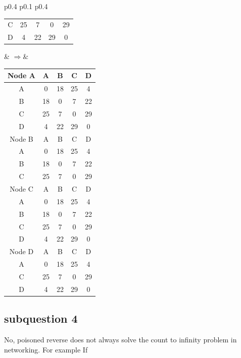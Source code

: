 \documentclass{article}
\begin{document}
\begin{tabular}{p{0.4\linewidth} p{0.1\linewidth} p{0.4\linewidth}}
\begin{tabular}{c|c|c|c|c}
        C & 25 & 7 & 0 & \color{red}29 \\
        D & 4 & 22 & \color{red}29 & 0 \\
        \hline
    \end{tabular}
    &  $\Rightarrow$&
    \begin{tabular}{c|c|c|c|c}
        \hline
        Node A & A & B & C & D \\
        \hline
        A & 0 & 18 & 25 & 4 \\
        B & 18 & 0 & 7 & 22 \\
        C & 25 & 7 & 0 & 29 \\
        D & 4 & 22 & 29 & 0 \\
        \hline
        \hline
        Node B & A & B & C & D \\
        \hline 
        A & 0 & 18 & 25 & 4 \\
        B & 18 & 0 & 7 & 22 \\
        C & 25 & 7 & 0 & 29 \\
        \hline
        \hline
        Node C & A & B & C & D \\
        \hline
        A & 0 & 18 & 25 & 4 \\
        B & 18 & 0 & 7 & 22 \\
        C & 25 & 7 & 0 & 29 \\
        D & 4 & 22 & 29 & 0 \\
        \hline
        \hline
        Node D & A & B & C & D \\
        \hline
        A & 0 & 18 & 25 & 4 \\
        C & 25 & 7 & 0 & 29 \\
        D & 4 & 22 & 29 & 0 \\
        \hline
    \end{tabular}
\end{tabular}

\subsection{subquestion 4}
No, poisoned reverse does not always solve the count to infinity problem in networking. For example If 
\end{document}
